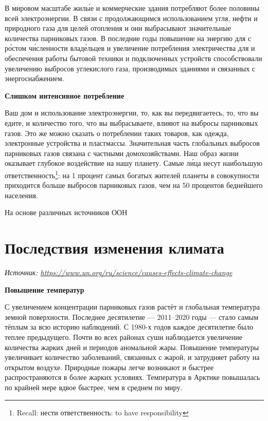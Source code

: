 В мировом масштабе жил\'{ы}е и коммерческие здания потребляют более половины всей электроэнергии. В связи с продолжающимся использованием угля, нефти и природного газа для целей отопления и  они выбрасывают значительные количества парниковых газов. В последние годы повышение  на энергию для  с р\'{о}стом ч\'{и}сленности влад\'{е}льцев  и увеличение потребления электричества для  и обеспечения работы бытовой техники и подключенных устройств способствовали увеличению выбросов углекислого газа, производимых зданиями и связанных с энергоснабжением.

\textbf{Слишком интенсивное потребление}

Ваш дом и использование электроэнергии, то, как вы передвигаетесь, то, что вы едите, и количество того, что вы выбрасываете, влияют на выбросы парниковых газов. Это же можно сказать о потреблении таких товаров, как одежда, электронные устройства и пластмассы. Значительная часть глобальных выбросов парниковых газов связана с частными домохозяйствами. Наш образ жизни оказывает глубокое воздействие на нашу планету. Самые  л\'{и}ца несут наибольшую ответственность\footnote{Recall: нести ответственность: to have responsibility}: на 1 процент самых богатых жителей планеты в совокупности приходится больше выбросов парниковых газов, чем на 50 процентов беднейшего населения.

На основе различных источников ООН


\section{Последствия изменения климата}
\textit{Источник: \url{https://www.un.org/ru/science/causes-effects-climate-change}}


\textbf{Повышение температур}

С увеличением концентрации парниковых газов растёт и глобальная температура земной поверхности. Последнее десятилетие --- 2011–2020 годы --- стало самым тёплым за всю историю наблюдений. С 1980-х годов каждое десятилетие было теплее предыдущего. Почти во всех районах суши наблюдается увеличение количества жарких дней и периодов аномальной жары. Повышение температуры увеличивает количество заболеваний, связанных с жарой, и затрудняет работу на открытом воздухе. Природные пожары легче возникают и быстрее распространяются в более жарких условиях. Температура в Арктике повышалась по крайней мере вдвое быстрее, чем в среднем по миру.

